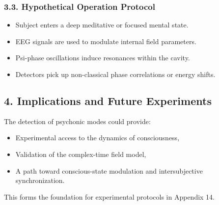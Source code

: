 \subsubsection*{3.3. Hypothetical Operation Protocol}

\begin{itemize}
  \item Subject enters a deep meditative or focused mental state.
  \item EEG signals are used to modulate internal field parameters.
  \item Psi-phase oscillations induce resonances within the cavity.
  \item Detectors pick up non-classical phase correlations or energy shifts.
\end{itemize}

\subsection*{4. Implications and Future Experiments}

The detection of psychonic modes could provide:
\begin{itemize}
  \item Experimental access to the dynamics of consciousness,
  \item Validation of the complex-time field model,
  \item A path toward conscious-state modulation and intersubjective synchronization.
\end{itemize}

This forms the foundation for experimental protocols in Appendix 14.

